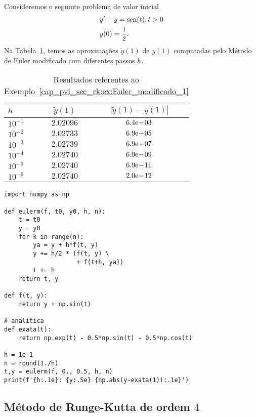 \begin{ex}\label{cap_pvi_sec_rk:ex:Euler_modificado_1}
  Consideremos o seguinte problema de valor inicial
  \begin{subequations}
    \begin{align}
      &y' - y = \operatorname{sen}(t), t>0\\
      &y(0) = \frac{1}{2}.
    \end{align}
\end{subequations}
Na Tabela~\ref{cap_pvi_sec_rk:tab:ex_Euler_modificado_1}, temos as aproximações $\tilde{y}(1)$ de $y(1)$ computadas pelo Método de Euler modificado com diferentes passos $h$.
 
  \begin{table}[H]
    \centering
    \begin{tabular}{l|cc}
      $h$ & $\tilde{y}(1)$ & $|\tilde{y}(1)-y(1)|$\\\hline
      $10^{-1}$ & $2.02096$ & $6.4\mathrm{e}\!-\!03$ \\
      $10^{-2}$ & $2.02733$ & $6.9\mathrm{e}\!-\!05$ \\
      $10^{-3}$ & $2.02739$ & $6.9\mathrm{e}\!-\!07$ \\
      $10^{-4}$ & $2.02740$ & $6.9\mathrm{e}\!-\!09$ \\
      $10^{-5}$ & $2.02740$ & $6.9\mathrm{e}\!-\!11$ \\
      $10^{-6}$ & $2.02740$ & $2.0\mathrm{e}\!-\!12$ \\\hline
    \end{tabular}
    \caption{Resultados referentes ao Exemplo~\ref{cap_pvi_sec_rk:ex:Euler_modificado_1}}
    \label{cap_pvi_sec_rk:tab:ex_Euler_modificado_1}
  \end{table}

\begin{lstlisting}[caption=eulerm.py]
import numpy as np

def eulerm(f, t0, y0, h, n):
    t = t0
    y = y0
    for k in range(n):
        ya = y + h*f(t, y)
        y += h/2 * (f(t, y) \
                    + f(t+h, ya))
        t += h
    return t, y

def f(t, y):
    return y + np.sin(t)

# analítica
def exata(t):
    return np.exp(t) - 0.5*np.sin(t) - 0.5*np.cos(t)

h = 1e-1
n = round(1./h)
t,y = eulerm(f, 0., 0.5, h, n)
print(f'{h:.1e}: {y:.5e} {np.abs(y-exata(1)):.1e}')
\end{lstlisting}
\end{ex}

\subsection{Método de Runge-Kutta de ordem $4$}

